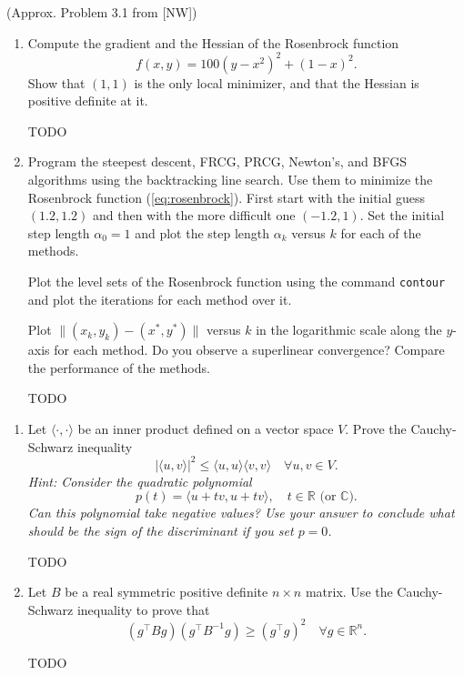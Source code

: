 \documentclass{../../../kin_math}
\begin{document}
\begin{questions}
  \question (Approx. Problem 3.1 from [NW])
  \begin{enumerate}
    \item Compute the gradient and the Hessian of the Rosenbrock function
    \begin{equation}
      \label{eq:rosenbrock}
      f(x, y) = 100(y - x^2)^2 + (1 - x)^2.
    \end{equation}
    Show that $(1, 1)$ is the only local minimizer, and that the Hessian is positive definite at it.
    \begin{solution}
      TODO
    \end{solution}
    \item Program the steepest descent, FRCG, PRCG, Newton's, and BFGS algorithms using the backtracking line search. Use them to minimize the Rosenbrock function (\ref{eq:rosenbrock}). First start with the initial guess $(1.2, 1.2)$ and then with the more difficult one $(-1.2, 1)$. Set the initial step length $\alpha_0 = 1$ and plot the step length $\alpha_k$ versus $k$ for each of the methods.

    Plot the level sets of the Rosenbrock function using the command \texttt{contour} and plot the iterations for each method over it.

    Plot $\lVert (x_k, y_k) - (x^*, y^*) \rVert$ versus $k$ in the logarithmic scale along the $y$-axis for each method. Do you observe a superlinear convergence? Compare the performance of the methods.
    \begin{solution}
      TODO
    \end{solution}
  \end{enumerate}

  \question
  \begin{enumerate}
    \item Let $\langle \cdot, \cdot \rangle$ be an inner product defined on a vector space $V$. Prove the Cauchy-Schwarz inequality
    \begin{equation}
      |\langle u, v \rangle|^2 \leq \langle u, u \rangle \langle v, v \rangle \quad \forall u, v \in V.
    \end{equation}
    \emph{Hint: Consider the quadratic polynomial}
    \begin{equation}
      p(t) = \langle u + tv, u + tv \rangle, \quad t \in \mathbb{R} \text{ (or $\mathbb{C}$)}.
    \end{equation}
    \emph{Can this polynomial take negative values? Use your answer to conclude what should be the sign of the discriminant if you set $p = 0$.}
    \begin{solution}
      TODO
    \end{solution}
    \item Let $B$ be a real symmetric positive definite $n \times n$ matrix. Use the Cauchy-Schwarz inequality to prove that
    \begin{equation}
      (g^\top B g)(g^\top B^{-1} g) \geq (g^\top g)^2 \quad \forall g \in \mathbb{R}^n.
    \end{equation}
    \begin{solution}
      TODO
    \end{solution}
  \end{enumerate}
\end{questions}
\end{document}
